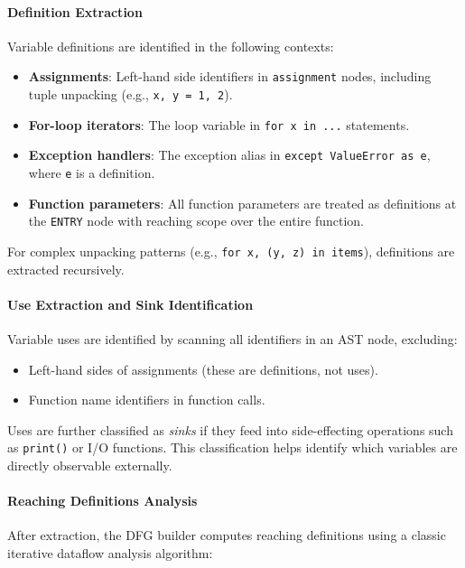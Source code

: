 \paragraph{Definition Extraction}

Variable definitions are identified in the following contexts:

\begin{itemize}
    \item \textbf{Assignments}: Left-hand side identifiers in \texttt{assignment} nodes, including tuple unpacking (e.g., \texttt{x, y = 1, 2}).
    \item \textbf{For-loop iterators}: The loop variable in \texttt{for x in ...} statements.
    \item \textbf{Exception handlers}: The exception alias in \texttt{except ValueError as e}, where \texttt{e} is a definition.
    \item \textbf{Function parameters}: All function parameters are treated as definitions at the \texttt{ENTRY} node with reaching scope over the entire function.
\end{itemize}

For complex unpacking patterns (e.g., \texttt{for x, (y, z) in items}), definitions are extracted recursively.

\paragraph{Use Extraction and Sink Identification}

Variable uses are identified by scanning all identifiers in an AST node, excluding:

\begin{itemize}
    \item Left-hand sides of assignments (these are definitions, not uses).
    \item Function name identifiers in function calls.
\end{itemize}

Uses are further classified as \emph{sinks} if they feed into side-effecting operations such as \texttt{print()} or I/O functions. This classification helps identify which variables are directly observable externally.

\paragraph{Reaching Definitions Analysis}

After extraction, the DFG builder computes reaching definitions using a classic iterative dataflow analysis algorithm:

